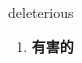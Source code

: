 
\begin{frame}
{\huge deleterious}
\begin{center}
\begin{enumerate}\Large
  \item \textbf{有害的}
\end{enumerate}
\end{center}
\end{frame}
